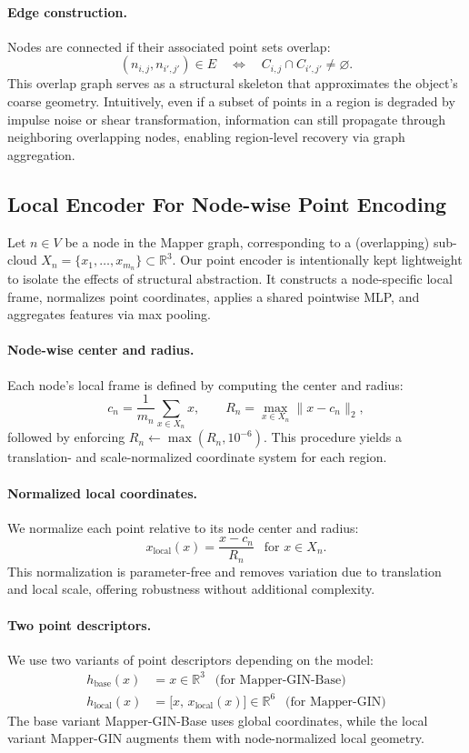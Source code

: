 \documentclass{article}
\begin{document}
\paragraph{Edge construction.}
Nodes are connected if their associated point sets overlap:
$$ (n_{i,j}, n_{i',j'}) \in E \quad\Longleftrightarrow\quad C_{i,j} \cap C_{i',j'} \neq \varnothing. $$
This overlap graph serves as a structural skeleton that approximates the object’s coarse geometry. Intuitively, even if a subset of points in a region is degraded by impulse noise or shear transformation, information can still propagate through neighboring overlapping nodes, enabling region‑level recovery via graph aggregation.

\subsection{Local Encoder For Node-wise Point Encoding} \label{sec:local_global_encoding}
Let $n \in V$ be a node in the Mapper graph, corresponding to a (overlapping) sub-cloud $X_n = \{x_1,\dots,x_{m_n}\} \subset \mathbb{R}^3$.
Our point encoder is intentionally kept lightweight to isolate the effects of structural abstraction. It constructs a node-specific local frame, normalizes point coordinates, applies a shared pointwise MLP, and aggregates features via max pooling.

\paragraph{Node-wise center and radius.}
Each node’s local frame is defined by computing the center and radius:
$$ c_n = \frac{1}{m_n}\sum_{x \in X_n}\!\! x, \qquad R_n = \max_{x\in X_n} \lVert x - c_n \rVert_2, $$
followed by enforcing $R_n \leftarrow \max(R_n,10^{-6})$.
This procedure yields a translation- and scale-normalized coordinate system for each region.

\paragraph{Normalized local coordinates.}
We normalize each point relative to its node center and radius:
$$ x_{\mathrm{local}}(x) = \frac{x - c_n}{R_n} \ \ \text{ for } x \in X_n. $$
This normalization is parameter-free and removes variation due to translation and local scale, offering robustness without additional complexity.

\paragraph{Two point descriptors.}
We use two variants of point descriptors depending on the model:
\begin{align*}
h_{\text{base}}(x) &= x \in \mathbb{R}^3 \ \ \text{ (for Mapper-GIN-Base)} \\
h_{\text{local}}(x) &= \big[x,\, x_{\mathrm{local}}(x)\big] \in \mathbb{R}^6
\ \ \text{ (for Mapper-GIN)}
\end{align*}
The base variant Mapper-GIN-Base uses global coordinates, while the local variant Mapper-GIN augments them with node-normalized local geometry.
\end{document}
